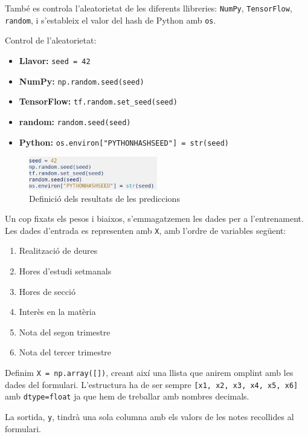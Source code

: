 També es controla l’aleatorietat de les diferents llibreries: \texttt{NumPy}, \texttt{TensorFlow}, \texttt{random}, i s'estableix el valor del hash de Python amb \texttt{os}.

Control de l’aleatorietat:
\begin{itemize}
\item \textbf{Llavor:} \texttt{seed = 42}
\item \textbf{NumPy:} \texttt{np.random.seed(seed)}
\item \textbf{TensorFlow:} \texttt{tf.random.set\_seed(seed)}
\item \textbf{random:} \texttt{random.seed(seed)}
\item \textbf{Python:} \texttt{os.environ["PYTHONHASHSEED"] = str(seed)}
\end{itemize}

\begin{figure}[h!]
\centering
\includegraphics[width=0.5\textwidth]{./figures/22.png}
\caption{Definició dels resultats de les prediccions}
\end{figure}

Un cop fixats els pesos i biaixos, s'emmagatzemen les dades per a l’entrenament. Les dades d’entrada es representen amb \texttt{X}, amb l’ordre de variables següent:

\begin{enumerate}
\item Realització de deures
\item Hores d’estudi setmanals
\item Hores de secció
\item Interès en la matèria
\item Nota del segon trimestre
\item Nota del tercer trimestre
\end{enumerate}

Definim \texttt{X = np.array([])}, creant així una llista que anirem omplint amb les dades del formulari. L’estructura ha de ser sempre \texttt{[x1, x2, x3, x4, x5, x6]} amb \texttt{dtype=float} ja que hem de treballar amb nombres decimals.

La sortida, \texttt{y}, tindrà una sola columna amb els valors de les notes recollides al formulari.

